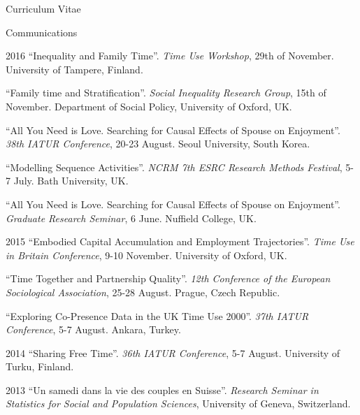 \documentclass[12pt,a4paper]{article}
\begin{document}
\begin{cv}{Curriculum Vitae}
\begin{cvlist}{Communications}
	 \item[2016]  ``Inequality and Family Time''. \emph{Time Use Workshop}, 29th of November. University of Tampere, Finland. 
	 
	 \item[]  ``Family time and Stratification''. \emph{Social Inequality Research Group}, 15th of November. Department of Social Policy, University of Oxford, UK.  
	 
	 \item[]  ``All You Need is Love. Searching for Causal Effects of Spouse on Enjoyment''. \emph{38th IATUR Conference}, 20-23 August. Seoul University, South Korea. 
	 
	 \item[]  ``Modelling Sequence Activities''. \emph{NCRM 7th ESRC Research Methods Festival}, 5-7 July. Bath University, UK. 
	 
	  \item[]  ``All You Need is Love. Searching for Causal Effects of Spouse on Enjoyment''. \emph{Graduate Research Seminar}, 6 June. Nuffield College, UK. 
	  
	   \item[2015]  ``Embodied Capital Accumulation and Employment Trajectories''. \emph{Time Use in Britain Conference}, 9-10 November. University of Oxford, UK.  
	   
	   	 \item[]  ``Time Together and Partnership Quality''. \emph{12th Conference of the European Sociological Association}, 25-28 August. Prague, Czech Republic.  
	   
	      \item[]  ``Exploring Co-Presence Data in the UK Time Use 2000''. \emph{37th IATUR Conference}, 5-7 August. Ankara, Turkey.  
	      
	       \item[2014]  ``Sharing Free Time''. \emph{36th IATUR Conference}, 5-7 August. University of Turku, Finland.  
	        
	        \item[2013] ``Un samedi dans la vie des couples en Suisse''. \emph{Research Seminar in Statistics for Social and Population Sciences}, University of Geneva, Switzerland. 
	        \end{cvlist}



  \date{~May~2018}
\end{cv}
\end{document}
